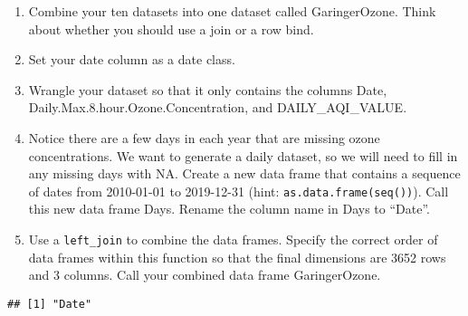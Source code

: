 \documentclass[
]{article}
\newenvironment{Shaded}{\begin{snugshade}}{\end{snugshade}}
\newcommand{\CommentTok}[1]{\textcolor[rgb]{0.56,0.35,0.01}{\textit{#1}}}
\newcommand{\DataTypeTok}[1]{\textcolor[rgb]{0.13,0.29,0.53}{#1}}
\newcommand{\KeywordTok}[1]{\textcolor[rgb]{0.13,0.29,0.53}{\textbf{#1}}}
\newcommand{\NormalTok}[1]{#1}
\newcommand{\OperatorTok}[1]{\textcolor[rgb]{0.81,0.36,0.00}{\textbf{#1}}}
\newcommand{\StringTok}[1]{\textcolor[rgb]{0.31,0.60,0.02}{#1}}
\begin{document}
\begin{enumerate}
\def\labelenumi{\arabic{enumi}.}
\setcounter{enumi}{1}
\item
  Combine your ten datasets into one dataset called GaringerOzone. Think
  about whether you should use a join or a row bind.
\item
  Set your date column as a date class.
\item
  Wrangle your dataset so that it only contains the columns Date,
  Daily.Max.8.hour.Ozone.Concentration, and DAILY\_AQI\_VALUE.
\item
  Notice there are a few days in each year that are missing ozone
  concentrations. We want to generate a daily dataset, so we will need
  to fill in any missing days with NA. Create a new data frame that
  contains a sequence of dates from 2010-01-01 to 2019-12-31 (hint:
  \texttt{as.data.frame(seq())}). Call this new data frame Days. Rename
  the column name in Days to ``Date''.
\item
  Use a \texttt{left\_join} to combine the data frames. Specify the
  correct order of data frames within this function so that the final
  dimensions are 3652 rows and 3 columns. Call your combined data frame
  GaringerOzone.
\end{enumerate}

\begin{Shaded}
\end{Shaded}

\begin{verbatim}
## [1] "Date"
\end{verbatim}
\end{document}

